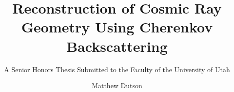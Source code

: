 \title{Reconstruction of Cosmic Ray Geometry Using Cherenkov Backscattering}
\subtitle{A Senior Honors Thesis Submitted to the Faculty of the University of Utah}
\author{Matthew Dutson}
\date{}

\maketitle

\begin{abstract}

\end{abstract}

\tableofcontents